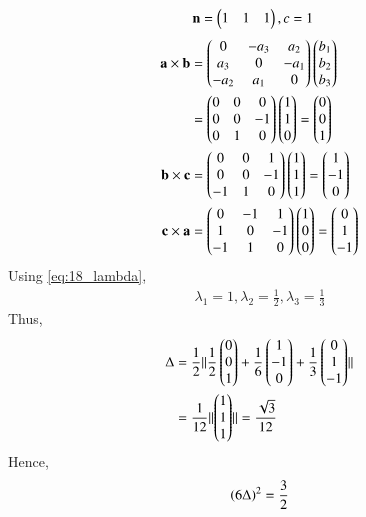 \documentclass[journal,12pt,twocolumn]{IEEEtran}
\renewcommand\thesection{\arabic{section}}
\begin{document}
\begin{enumerate}[label=\thesection.\arabic*
,ref=\thesection.\theenumi]
\begin{align}
\\
\mathbf{n} &= \begin{pmatrix}1 & 1 & 1\end{pmatrix}, c= 1
\end{align}
%
\solution 
\begin{align}
\label{eq:18_cross}
\mathbf{a}\times \mathbf{b} &= \begin{pmatrix}0 & -a_3 & a_2 \\ a_3 & 0 & -a_1 \\ -a_2 & a_1 & 0\end{pmatrix}\begin{pmatrix}b_1 \\ b_2 \\ b_3\end{pmatrix}
\nonumber \\
&= \begin{pmatrix}0 & 0 & 0 \\ 0 & 0 & -1 \\ 0 & 1 & 0\end{pmatrix}\begin{pmatrix}1 \\ 1 \\ 0\end{pmatrix}
=\begin{pmatrix}0 \\ 0 \\ 1\end{pmatrix}
\\
\mathbf{b}\times \mathbf{c} &= \begin{pmatrix}0 & 0 & 1 \\ 0 & 0 & -1 \\ -1 & 1 & 0\end{pmatrix}\begin{pmatrix}1 \\ 1 \\ 1\end{pmatrix}
= \begin{pmatrix}1 \\ -1 \\ 0\end{pmatrix}
\\
\mathbf{c}\times \mathbf{a} &= \begin{pmatrix}0 & -1 & 1 \\ 1 & 0 & -1 \\ -1 & 1 & 0\end{pmatrix}\begin{pmatrix}1 \\ 0 \\ 0\end{pmatrix}
= \begin{pmatrix}0 \\ 1 \\ -1\end{pmatrix}
\end{align}
%
Using \eqref{eq:18_lambda},
\begin{align}
\lambda_1=1, \lambda_2 = \frac{1}{2}, \lambda_3 = \frac{1}{3}
\end{align}
Thus,
\begin{align}
\Delta &= \frac{1}{2}\lVert\frac{1}{2}\begin{pmatrix}0 \\ 0 \\ 1\end{pmatrix}+\frac{1}{6}\begin{pmatrix}1 \\ -1 \\ 0\end{pmatrix}+\frac{1}{3}\begin{pmatrix}0 \\ 1 \\ -1\end{pmatrix}\rVert
\\
&= \frac{1}{12}\lVert\begin{pmatrix}1 \\ 1 \\ 1\end{pmatrix}\rVert = \frac{\sqrt{3}}{12}
\end{align}
%
Hence,
\begin{align}
\left(6 \Delta\right)^2 = \frac{3}{2}
\end{align}
\end{enumerate}
\end{document}
